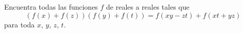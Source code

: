 Encuentra todas las funciones $f$ de reales a reales tales que 
 \[ \left(f(x)+f(z)\right)\left(f(y)+f(t)\right)=f(xy-zt)+f(xt+yz) \] para toda $x$, $y$, $z$, $t$.